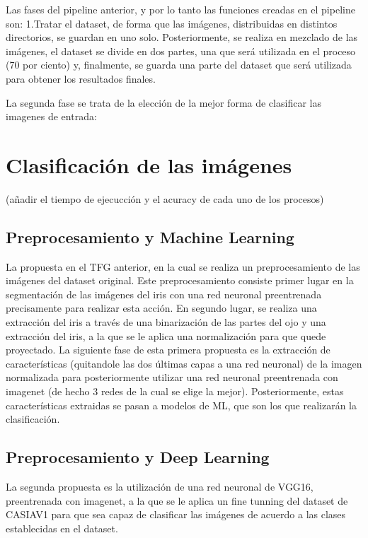 Las fases del pipeline anterior, y por lo tanto las funciones creadas en el pipeline son:
1.Tratar el dataset, de forma que las imágenes, distribuidas en distintos directorios, se guardan en uno solo. Posteriormente, se realiza en mezclado de las imágenes, el dataset se divide en dos partes, 
una que será utilizada en el proceso (70 por ciento) y, finalmente, se guarda una parte del dataset que será utilizada para obtener los resultados finales.


La segunda fase se trata de la elección de la mejor forma de clasificar las imagenes de entrada:

\section{Clasificación de las imágenes}

(añadir el tiempo de ejecucción y el acuracy de cada uno de los procesos)

\subsection{Preprocesamiento y Machine Learning}

La propuesta en el TFG anterior, en la cual se realiza un preprocesamiento de las imágenes del dataset original. Este preprocesamiento consiste primer lugar 
en la segmentación de las imágenes del iris con una red neuronal preentrenada precisamente para realizar esta acción. En segundo lugar, se realiza una extracción
del iris a través de una binarización de las partes del ojo y una extracción del iris, a la que se le aplica una normalización para que quede proyectado.
La siguiente fase de esta primera propuesta es la extracción de características (quitandole las dos últimas capas a una red neuronal) de la imagen normalizada
 para posteriormente utilizar una red neuronal preentrenada con imagenet (de hecho 3 redes de la cual se elige la mejor). Posteriormente, estas características
 extraidas se pasan a modelos de ML, que son los que realizarán la clasificación. 

\subsection{Preprocesamiento y Deep Learning}

La segunda propuesta es la utilización de una red neuronal de VGG16, preentrenada con imagenet, a la que se le aplica un fine tunning del dataset de CASIAV1 para
que sea capaz de clasificar las imágenes de acuerdo a las clases establecidas en el dataset.

